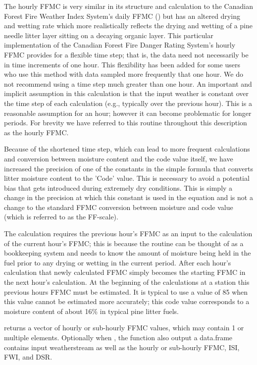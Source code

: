 \documentclass[a4paper]{book}
\begin{document}
\begin{Details}\relax
The hourly FFMC is very similar in its structure and calculation to the
Canadian Forest Fire Weather Index System's daily FFMC ()
but has an altered drying and wetting rate which more realistically reflects
the drying and wetting of a pine needle litter layer sitting on a decaying
organic layer.  This particular implementation of the Canadian Forest Fire
Danger Rating System's hourly FFMC provides for a flexible time step; that
is, the data need not necessarily be in time increments of one hour.  This
flexibility has been added for some users who use this method with data
sampled more frequently that one hour.  We do not recommend using a time
step much greater than one hour. An important and implicit assumption in
this calculation is that the input weather is constant over the time step of
each calculation (e.g., typically over the previous hour).  This is a
reasonable assumption for an hour; however it can become problematic for
longer periods.  For brevity we have referred to this routine throughout
this description as the hourly FFMC.

Because of the shortened time step, which can lead to more frequent
calculations and conversion between moisture content and the code value
itself, we have increased the precision of one of the constants in the
simple formula that converts litter moisture content to the 'Code' value.
This is necessary to avoid a potential bias that gets introduced during
extremely dry conditions.  This is simply a change in the precision at which
this constant is used in the equation and is not a change to the standard
FFMC conversion between moisture and code value (which is referred to as the
FF-scale).

The calculation requires the previous hour's FFMC as an input to the
calculation of the current hour's FFMC; this is because the routine can be
thought of as a bookkeeping system and needs to know the amount of moisture
being held in the fuel prior to any drying or wetting in the current period.
After each hour's calculation that newly calculated FFMC simply becomes the
starting FFMC in the next hour's calculation.  At the beginning of the
calculations at a station this previous hours FFMC must be estimated. It is
typical to use a value of 85 when this value cannot be estimated more
accurately; this code value corresponds to a moisture content of about 16\%
in typical pine litter fuels.
\end{Details}
%
\begin{Value}
 returns a vector of hourly or sub-hourly FFMC values,
which may contain 1 or multiple elements. Optionally when
, the function also output a data.frame contains input
weatherstream as well as the hourly or sub-hourly FFMC, ISI, FWI, and DSR.
\end{Value}
\end{document}
